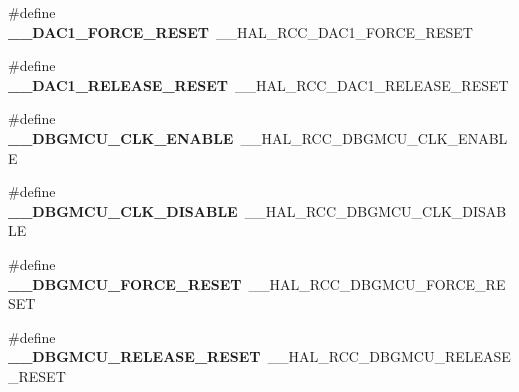 \begin{DoxyCompactItemize}
\item 
\hypertarget{group___h_a_l___r_c_c___aliased_gaf0e724beab212d0055d9186d7790bccd}{\#define {\bfseries \-\_\-\-\_\-\-D\-A\-C1\-\_\-\-F\-O\-R\-C\-E\-\_\-\-R\-E\-S\-E\-T}~\-\_\-\-\_\-\-H\-A\-L\-\_\-\-R\-C\-C\-\_\-\-D\-A\-C1\-\_\-\-F\-O\-R\-C\-E\-\_\-\-R\-E\-S\-E\-T}\label{group___h_a_l___r_c_c___aliased_gaf0e724beab212d0055d9186d7790bccd}

\item 
\hypertarget{group___h_a_l___r_c_c___aliased_ga7492fedac23dcce3cf6fcac88c4a5688}{\#define {\bfseries \-\_\-\-\_\-\-D\-A\-C1\-\_\-\-R\-E\-L\-E\-A\-S\-E\-\_\-\-R\-E\-S\-E\-T}~\-\_\-\-\_\-\-H\-A\-L\-\_\-\-R\-C\-C\-\_\-\-D\-A\-C1\-\_\-\-R\-E\-L\-E\-A\-S\-E\-\_\-\-R\-E\-S\-E\-T}\label{group___h_a_l___r_c_c___aliased_ga7492fedac23dcce3cf6fcac88c4a5688}

\item 
\hypertarget{group___h_a_l___r_c_c___aliased_ga22d83d5c92b7c06f58299bf76c0ba1ef}{\#define {\bfseries \-\_\-\-\_\-\-D\-B\-G\-M\-C\-U\-\_\-\-C\-L\-K\-\_\-\-E\-N\-A\-B\-L\-E}~\-\_\-\-\_\-\-H\-A\-L\-\_\-\-R\-C\-C\-\_\-\-D\-B\-G\-M\-C\-U\-\_\-\-C\-L\-K\-\_\-\-E\-N\-A\-B\-L\-E}\label{group___h_a_l___r_c_c___aliased_ga22d83d5c92b7c06f58299bf76c0ba1ef}

\item 
\hypertarget{group___h_a_l___r_c_c___aliased_ga2f545f52b81246ca674c70fbd6c4d558}{\#define {\bfseries \-\_\-\-\_\-\-D\-B\-G\-M\-C\-U\-\_\-\-C\-L\-K\-\_\-\-D\-I\-S\-A\-B\-L\-E}~\-\_\-\-\_\-\-H\-A\-L\-\_\-\-R\-C\-C\-\_\-\-D\-B\-G\-M\-C\-U\-\_\-\-C\-L\-K\-\_\-\-D\-I\-S\-A\-B\-L\-E}\label{group___h_a_l___r_c_c___aliased_ga2f545f52b81246ca674c70fbd6c4d558}

\item 
\hypertarget{group___h_a_l___r_c_c___aliased_gad77740fa4597914c4cd28b6b322ea714}{\#define {\bfseries \-\_\-\-\_\-\-D\-B\-G\-M\-C\-U\-\_\-\-F\-O\-R\-C\-E\-\_\-\-R\-E\-S\-E\-T}~\-\_\-\-\_\-\-H\-A\-L\-\_\-\-R\-C\-C\-\_\-\-D\-B\-G\-M\-C\-U\-\_\-\-F\-O\-R\-C\-E\-\_\-\-R\-E\-S\-E\-T}\label{group___h_a_l___r_c_c___aliased_gad77740fa4597914c4cd28b6b322ea714}

\item 
\hypertarget{group___h_a_l___r_c_c___aliased_ga48cf864f29a3c9a1bd73664291824538}{\#define {\bfseries \-\_\-\-\_\-\-D\-B\-G\-M\-C\-U\-\_\-\-R\-E\-L\-E\-A\-S\-E\-\_\-\-R\-E\-S\-E\-T}~\-\_\-\-\_\-\-H\-A\-L\-\_\-\-R\-C\-C\-\_\-\-D\-B\-G\-M\-C\-U\-\_\-\-R\-E\-L\-E\-A\-S\-E\-\_\-\-R\-E\-S\-E\-T}\label{group___h_a_l___r_c_c___aliased_ga48cf864f29a3c9a1bd73664291824538}


\end{DoxyCompactItemize}
